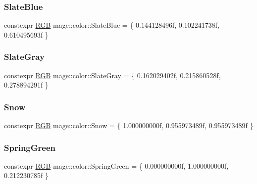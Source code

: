 \mbox{\label{namespacemage_1_1color_a0050809618b8a86850ccfee8b48e3d71}} 
\subsubsection{\texorpdfstring{Slate\+Blue}{SlateBlue}}
{\footnotesize\ttfamily constexpr \mbox{\hyperlink{structmage_1_1_r_g_b}{R\+GB}} mage\+::color\+::\+Slate\+Blue = \{ 0.\+144128496f, 0.\+102241738f, 0.\+610495693f \}}

\mbox{\label{namespacemage_1_1color_a1553763ab8b4309ffb51fc4f48ed2a12}} 
\subsubsection{\texorpdfstring{Slate\+Gray}{SlateGray}}
{\footnotesize\ttfamily constexpr \mbox{\hyperlink{structmage_1_1_r_g_b}{R\+GB}} mage\+::color\+::\+Slate\+Gray = \{ 0.\+162029402f, 0.\+215860528f, 0.\+278894291f \}}

\mbox{\label{namespacemage_1_1color_aab49681d71304f41e6c9606093ab5b95}} 
\subsubsection{\texorpdfstring{Snow}{Snow}}
{\footnotesize\ttfamily constexpr \mbox{\hyperlink{structmage_1_1_r_g_b}{R\+GB}} mage\+::color\+::\+Snow = \{ 1.\+000000000f, 0.\+955973489f, 0.\+955973489f \}}

\mbox{\label{namespacemage_1_1color_acb2eb0c5c4be0356ad6614ff63c36738}} 
\subsubsection{\texorpdfstring{Spring\+Green}{SpringGreen}}
{\footnotesize\ttfamily constexpr \mbox{\hyperlink{structmage_1_1_r_g_b}{R\+GB}} mage\+::color\+::\+Spring\+Green = \{ 0.\+000000000f, 1.\+000000000f, 0.\+212230785f \}}

